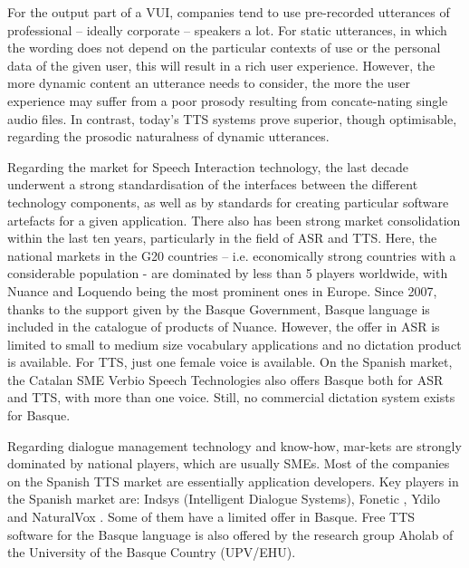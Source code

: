 \begin{multicols}{2}

For the output part of a VUI, companies tend to use pre-recorded utterances of professional – ideally corporate – speakers a lot. For static utterances, in which the wording does not depend on the particular contexts of use or the personal data of the given user, this will result in a rich user experience. However, the more dynamic content an utterance needs to consider, the more the user experience may suffer from a poor prosody resulting from concate-nating single audio files. In contrast, today’s TTS systems prove superior, though optimisable, regarding the prosodic naturalness of dynamic utterances.  

Regarding the market for Speech Interaction technology, the last decade underwent a strong standardisation of the interfaces between the different technology components, as well as by standards for creating particular software artefacts for a given application. There also has been strong market consolidation within the last ten years, particularly in the field of ASR and TTS. Here, the national markets in the G20 countries – i.e. economically strong countries with a considerable population - are dominated by less than 5 players worldwide, with Nuance and Loquendo being the most prominent ones in Europe. Since 2007, thanks to the support given by the Basque Government, Basque language is included in the catalogue of products of Nuance. However, the offer in ASR is limited to small to medium size vocabulary applications and no dictation product is available. For TTS, just one female voice is available. On the Spanish market, the Catalan SME Verbio Speech Technologies \cite{BAS-Nota29}  also offers Basque both for ASR and TTS, with more than one voice.  Still, no commercial dictation system exists for Basque. 

Regarding dialogue management technology and know-how, mar-kets are strongly dominated by national players, which are usually SMEs. Most of the companies on the Spanish TTS market are essentially application developers. Key players in the Spanish market are: Indsys \cite{BAS-Nota30}  (Intelligent Dialogue Systems), Fonetic \cite{BAS-Nota31}, Ydilo \cite{BAS-Nota32}  and NaturalVox \cite{BAS-Nota33}. Some of them have a limited offer in Basque. Free TTS software for the Basque language is also offered by the research group Aholab \cite{BAS-Nota34} of the University of the Basque Country (UPV/EHU).


\end{multicols}
